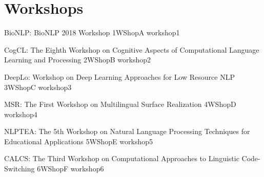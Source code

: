 \chapter[Workshops: \daydate]{Workshops}
\thispagestyle{emptyheader}
\vfill




\clearpage
        


\begin{wsschedule}
  {BioNLP: BioNLP 2018 Workshop}
  {1}{WShopA}
  {workshop1}
  {\WShopLocA}
  
\end{wsschedule}

\begin{wsschedule}
  {CogCL: The Eighth Workshop on Cognitive Aspects of Computational Language Learning and Processing}
  {2}{WShopB}
  {workshop2}
  {\WShopLocB}
  
\end{wsschedule}

\begin{wsschedule}
  {DeepLo: Workshop on Deep Learning Approaches for Low Resource NLP}
  {3}{WShopC}
  {workshop3}
  {\WShopLocC}
  \clearpage
\end{wsschedule}

\begin{wsschedule}
  {MSR: The First Workshop on Multilingual Surface Realization}
  {4}{WShopD}
  {workshop4}
  {\WShopLocD}
  
\end{wsschedule}

\begin{wsschedule}
  {NLPTEA: The 5th Workshop on Natural Language Processing Techniques 
  for Educational Applications}
  {5}{WShopE}
  {workshop5}
  {\WShopLocE}
  
\end{wsschedule}

\begin{wsschedule}
  {CALCS: The Third Workshop on Computational Approaches to Linguistic 
  Code-Switching}
  {6}{WShopF}
  {workshop6}
  {\WShopLocF}
  
\end{wsschedule}

